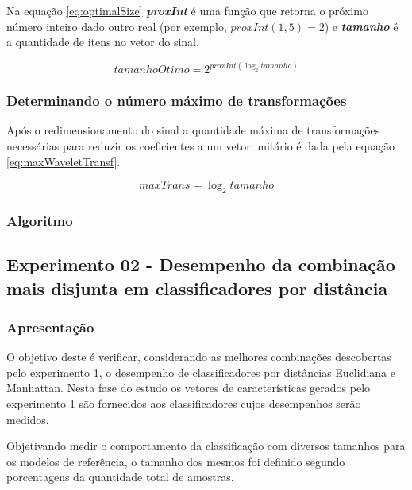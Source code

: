 \begin{myenv}{1.5}
					\par Na equação \ref{eq:optimalSize} \textit{\textbf{proxInt}} é uma função que retorna o próximo número inteiro dado outro real (por exemplo, $proxInt(1,5) = 2$) e \textit{\textbf{tamanho}} é a quantidade de itens no vetor do sinal.

					\begin{equation}
						tamanhoOtimo=2^{proxInt(\log_{2}tamanho)}
						\label{eq:optimalSize}
					\end{equation} 
				
				\subsubsection{Determinando o número máximo de transformações}
					\par Após o redimensionamento do sinal a quantidade máxima de transformações necessárias para reduzir os coeficientes a um vetor unitário é dada pela equação \ref{eq:maxWaveletTransf}. 
					
					\begin{equation}
						maxTrans=\log_{2}tamanho
						\label{eq:maxWaveletTransf}
					\end{equation}
	

				\subsubsection{Algoritmo}
				

			\subsection{Experimento 02 - Desempenho da combinação mais disjunta em classificadores por distância}
			\label{chap:propApproach:sec:Experimento01}
				\subsubsection{Apresentação}
					\par O objetivo deste é verificar, considerando as melhores combinações descobertas pelo experimento 1, o desempenho de classificadores por distâncias Euclidiana e Manhattan. Nesta fase do estudo os vetores de características gerados pelo experimento 1 são fornecidos aos classificadores cujos desempenhos serão medidos.
					
					\par Objetivando medir o comportamento da classificação com diversos tamanhos para os modelos de referência, o tamanho dos mesmos foi definido segundo porcentagens da quantidade total de amostras.
					

\end{myenv}
